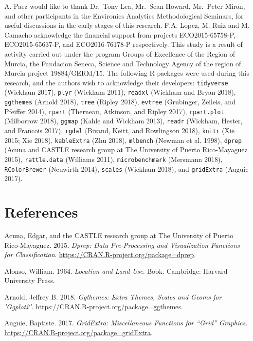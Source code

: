 \documentclass[]{elsarticle} %
\begin{document}
A. Paez would like to thank Dr.~Tony Lea, Mr.~Sean Howard, Mr.~Peter
Miron, and other participants in the Environics Analytics Methodological
Seminars, for useful discussions in the early stages of this research.
F.A. Lopez, M. Ruiz and M. Camacho acknowledge the financial support
from projects ECO2015-65758-P, ECO2015-65637-P, and ECO2016-76178-P
respectively. This study is a result of activity carried out under the
program Groups of Excellence of the Region of Murcia, the Fundacion
Seneca, Science and Technology Agency of the region of Murcia project
19884/GERM/15. The following R packages were used during this research,
and the authors wish to acknowledge their developers: \texttt{tidyverse}
(Wickham 2017), \texttt{plyr} (Wickham 2011), \texttt{readxl} (Wickham
and Bryan 2018), \texttt{ggthemes} (Arnold 2018), \texttt{tree} (Ripley
2018), \texttt{evtree} (Grubinger, Zeileis, and Pfeiffer 2014),
\texttt{rpart} (Therneau, Atkinson, and Ripley 2017),
\texttt{rpart.plot} (Milborrow 2018), \texttt{ggmap} (Kahle and Wickham
2013), \texttt{readr} (Wickham, Hester, and Francois 2017),
\texttt{rgdal} (Bivand, Keitt, and Rowlingson 2018), \texttt{knitr} (Xie
2015; Xie 2018), \texttt{kableExtra} (Zhu 2018), \texttt{mlbench}
(Newman et al. 1998), \texttt{dprep} (Acuna and CASTLE research group at
The University of Puerto Rico-Mayaguez 2015), \texttt{rattle.data}
(Williams 2011), \texttt{microbenchmark} (Mersmann 2018),
\texttt{RColorBrewer} (Neuwirth 2014), \texttt{scales} (Wickham 2018),
and \texttt{gridExtra} (Auguie 2017).

\section*{References}\label{references}

\hypertarget{refs}{}
\hypertarget{ref-Acuna2015}{}
Acuna, Edgar, and the CASTLE research group at The University of Puerto
Rico-Mayaguez. 2015. \emph{Dprep: Data Pre-Processing and Visualization
Functions for Classification}.
\url{https://CRAN.R-project.org/package=dprep}.

\hypertarget{ref-Alonso1964}{}
Alonso, William. 1964. \emph{Location and Land Use}. Book. Cambridge:
Harvard University Press.

\hypertarget{ref-Arnold2018}{}
Arnold, Jeffrey B. 2018. \emph{Ggthemes: Extra Themes, Scales and Geoms
for 'Ggplot2'}. \url{https://CRAN.R-project.org/package=ggthemes}.

\hypertarget{ref-Auguie2017}{}
Auguie, Baptiste. 2017. \emph{GridExtra: Miscellaneous Functions for
``Grid'' Graphics}. \url{https://CRAN.R-project.org/package=gridExtra}.
\end{document}
